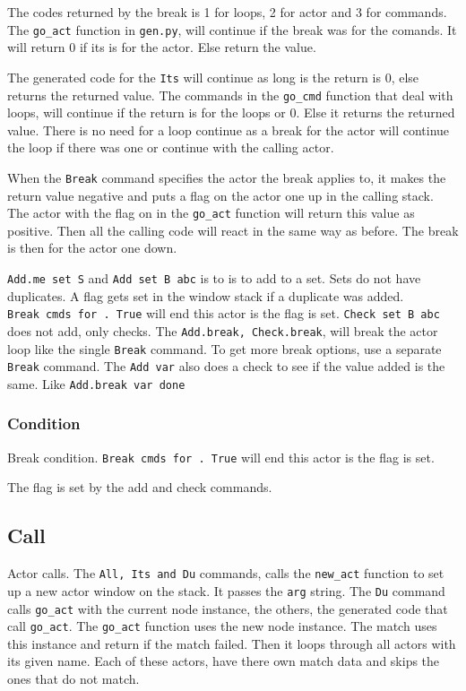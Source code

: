 \documentclass[11pt]{article}
\begin{document}
The codes returned by the break is 1 for loops, 2 for actor and 3 for
commands. The \texttt{go\_act} function in \texttt{gen.py}, will
continue if the break was for the comands. It will return 0 if its is
for the actor. Else return the value.

The generated code for the \texttt{Its} will continue as long is the
return is 0, else returns the returned value. The commands in the
\texttt{go\_cmd} function that deal with loops, will continue if the
return is for the loops or 0. Else it returns the returned value. There
is no need for a loop continue as a break for the actor will continue
the loop if there was one or continue with the calling actor.

When the \texttt{Break} command specifies the actor the break applies
to, it makes the return value negative and puts a flag on the actor one
up in the calling stack. The actor with the flag on in the
\texttt{go\_act} function will return this value as positive. Then all
the calling code will react in the same way as before. The break is then
for the actor one down.

\texttt{Add.me\ set\ S} and \texttt{Add\ set\ B\ abc} is to is to add to
a set. Sets do not have duplicates. A flag gets set in the window stack
if a duplicate was added. \texttt{Break\ cmds\ for\ .\ True} will end
this actor is the flag is set. \texttt{Check\ set\ B\ abc} does not add,
only checks. The \texttt{Add.break,\ Check.break}, will break the actor
loop like the single \texttt{Break} command. To get more break options,
use a separate \texttt{Break} command. The \texttt{Add\ var} also does a
check to see if the value added is the same. Like
\texttt{Add.break\ var\ done}

\subsubsection{Condition}
Break condition.
\texttt{Break\ cmds\ for\ .\ True} will end this actor is the flag is
set.

The flag is set by the add and check commands.

\subsection{Call}
Actor calls.
The \texttt{All,\ Its\ and\ Du} commands, calls the \texttt{new\_act}
function to set up a new actor window on the stack. It passes the
\texttt{arg} string. The \texttt{Du} command calls \texttt{go\_act} with
the current node instance, the others, the generated code that call
\texttt{go\_act}. The \texttt{go\_act} function uses the new node
instance. The match uses this instance and return if the match failed.
Then it loops through all actors with its given name. Each of these
actors, have there own match data and skips the ones that do not match.
\end{document}

